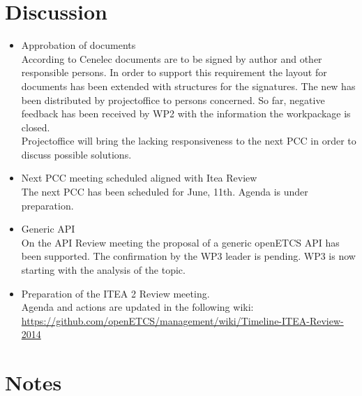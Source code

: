 \documentclass[a4paper, 11pt]{article}
\begin{document}
\section{Discussion}
\begin{itemize}
\item Approbation of documents\\
According to Cenelec documents are to be signed by author and other responsible persons. In order to support this requirement the layout for documents has been extended with structures for the signatures. The new has been distributed by projectoffice to persons concerned. So far, negative feedback has been received by WP2 with the information the workpackage is closed.\\
Projectoffice will bring the lacking responsiveness to the next PCC in order to discuss possible solutions.

\item Next PCC meeting scheduled aligned with Itea Review\\
The next PCC has been scheduled for June, 11th. Agenda is under preparation.

\item Generic API\\
On the API Review meeting the proposal of a generic openETCS API has been supported. The confirmation by the WP3 leader is pending. WP3 is now starting with the analysis of the topic. 

\item Preparation of the ITEA 2 Review meeting.\\
Agenda and actions are updated in the following wiki:
\url{https://github.com/openETCS/management/wiki/Timeline-ITEA-Review-2014}

\end{itemize}

\section{Notes}
\end{document}
